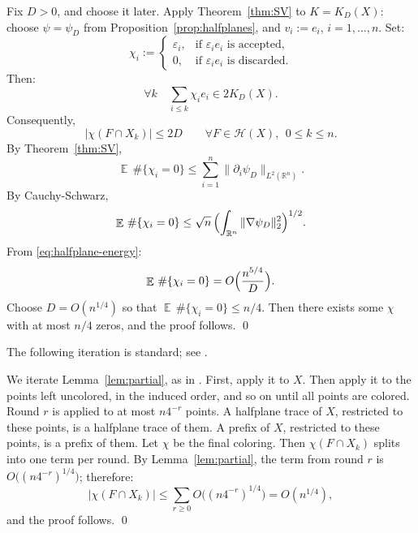 \documentclass[12pt,reqno]{amsart}
\makeatletter
\renewenvironment{proof}[1][\proofname]{%
  \par\vspace{\topsep}%
  \normalfont\topsep6\p@\@plus6\p@\relax
  \trivlist
  \item[\hskip\labelsep\itshape #1\@addpunct{.}]\ignorespaces
}{%
  \endtrivlist
}
\numberwithin{equation}{section}
\DeclareMathOperator{\E}{\mathbb{E}}
\def \R {\mathbb{R}}
\def \e {\varepsilon}
\makeatother
\begin{document}
\begin{proof}
Fix \(D>0\), and choose 
it later. Apply Theorem~\ref{thm:SV} to \(K=K_D(X)\): choose \(\psi=\psi_D\) from Proposition~\ref{prop:halfplanes}, and \(v_i:=e_i\), \(i=1,\ldots,n\). Set:
\[
\chi_i:=\begin{cases}
\e_i, & \text{if \(\e_ie_i\) is accepted},\\
0, & \text{if \(\e_ie_i\) is discarded}.
\end{cases}
\]
Then:
\[
\forall k\quad \sum_{i\le k}\chi_ie_i\in2K_D(X).
\]
Consequently,
\begin{equation}\label{eq:partial-prefix}
|\chi(F\cap X_k)|\le2D\qquad\forall F\in\mathcal H(X),\ \ 0\le k\le n.
\end{equation}
By Theorem~\ref{thm:SV},
\[
\E\,\#\{\chi_i=0\}
\le\sum_{i=1}^n\|\partial_i\psi_D\|_{L^2(\R^n)}.
\]
By Cauchy-Schwarz,
\[
\E\,\#\{\chi_i=0\}
\le \sqrt n\,\Bigl(\int_{\R^n}\|\nabla\psi_D\|_2^2\Bigr)^{1/2}.
\]
From \eqref{eq:halfplane-energy}:
\[
\E\,\#\{\chi_i=0\} =O\Bigl(\frac{n^{5/4}}{D}\Bigr).
\]
Choose \(D=O(n^{1/4})\) so that 
\(\E\,\#\{\chi_i=0\}\le n/4\). Then there exists some \(\chi\) with at most \(n/4\) zeros, and the proof follows. \qed
\end{proof}
\smallskip%

\begin{proof}[Proof of Theorem~\ref{thm:prefix}]
The following iteration is standard; see \cite{Spencer-6}. 
\smallskip%

We iterate Lemma~\ref{lem:partial}, as in 
\cite[\S\,2]{Versh-Sm-4}. First, apply it to \(X\). 
Then apply it to the points left uncolored, in the induced order, and so on until all points are colored. Round \(r\) is applied to at most \(n4^{-r}\) points. A halfplane trace of \(X\), restricted to these points, is a halfplane trace of them. A prefix of \(X\), restricted to these points, 
is a prefix of them. Let \(\chi\) be the 
final coloring. Then \(\chi(F\cap X_k)\) splits into one term per round. By Lemma~\ref{lem:partial}, the term from round \(r\) is \(O\bigl((n4^{-r})^{1/4}\bigr)\); therefore:
\[
|\chi(F\cap X_k)|\le\sum_{r\ge0}O\bigl((n4^{-r})^{1/4}\bigr)=O(n^{1/4}),
\]
and the proof follows. \qed
\end{proof}
\end{document}
